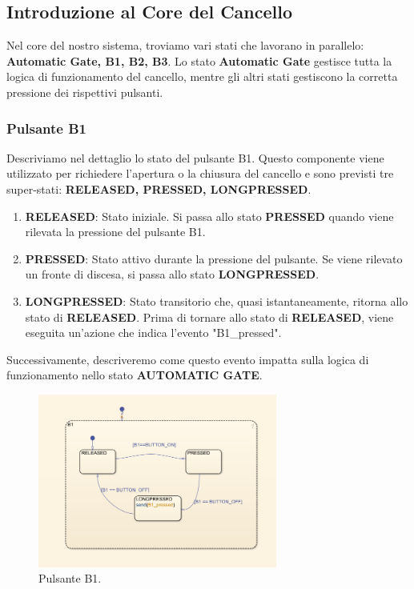 \documentclass[12pt]{article}
\begin{document}
\subsection{Introduzione al Core del Cancello}

Nel core del nostro sistema, troviamo vari stati che lavorano in parallelo: \textbf{Automatic Gate, B1, B2, B3}. Lo stato \textbf{Automatic Gate} gestisce tutta la logica di funzionamento del cancello, mentre gli altri stati gestiscono la corretta pressione dei rispettivi pulsanti.

\subsubsection{Pulsante B1}

Descriviamo nel dettaglio lo stato del pulsante B1. Questo componente viene utilizzato per richiedere l'apertura o la chiusura del cancello e sono previsti tre super-stati: \textbf{RELEASED, PRESSED, LONGPRESSED}.

\begin{enumerate}
    \item \textbf{RELEASED}: Stato iniziale. Si passa allo stato \textbf{PRESSED} quando viene rilevata la pressione del pulsante B1.
    \item \textbf{PRESSED}: Stato attivo durante la pressione del pulsante. Se viene rilevato un fronte di discesa, si passa allo stato \textbf{LONGPRESSED}.
    \item \textbf{LONGPRESSED}: Stato transitorio che, quasi istantaneamente, ritorna allo stato di \textbf{RELEASED}. Prima di tornare allo stato di \textbf{RELEASED}, viene eseguita un'azione che indica l'evento "B1\_pressed".
\end{enumerate}

\noindent Successivamente, descriveremo come questo evento impatta sulla logica di funzionamento nello stato \textbf{AUTOMATIC GATE}.

\begin{figure}[h]
    \centering
    \includegraphics[width=0.7\textwidth]{imm/Pulsante_B1.png}
    \caption{Pulsante B1.}
\end{figure}
\newpage
\end{document}
